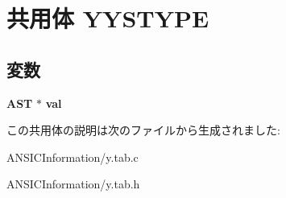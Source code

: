 \section{共用体 YYSTYPE}
\label{union_y_y_s_t_y_p_e}
\subsection*{変数}
\begin{DoxyCompactItemize}
\item 
{\bf AST} $\ast$ {\bfseries val}\label{union_y_y_s_t_y_p_e_a3b04809adaefadff0f3ef7791aacb812}

\end{DoxyCompactItemize}


この共用体の説明は次のファイルから生成されました:\begin{DoxyCompactItemize}
\item 
ANSICInformation/y.tab.c\item 
ANSICInformation/y.tab.h\end{DoxyCompactItemize}
